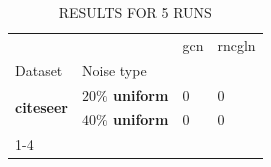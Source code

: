 \begin{table}
\caption{RESULTS FOR 5 RUNS}
\begin{tabular}{llll}
\toprule
 &  & gcn & rncgln \\
Dataset & Noise type &  &  \\
\midrule
\multirow[t]{2}{*}{\textbf{citeseer}} & \textbf{$ 20 \% $ uniform} & 0 & 0 \\
\textbf{} & \textbf{$ 40 \% $ uniform} & 0 & 0 \\
\cline{1-4}
\bottomrule
\end{tabular}
\end{table}

